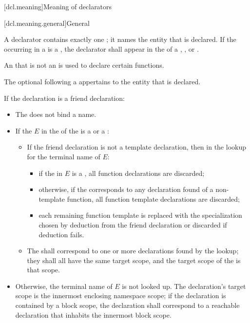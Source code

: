 [dcl.meaning]{Meaning of declarators}%

[dcl.meaning.general]{General}%

\pnum
{}%
A declarator contains exactly one ;
it names the entity that is declared.
If the  occurring in a 
is a ,
the declarator shall appear in the  of a
,
, or
.
\begin{note}
An  that is not an 
is used to declare
certain functions.
\end{note}
The optional  following a  appertains to the entity that is declared.

\pnum
If the declaration is a friend declaration:
\begin{itemize}
\item
The  does not bind a name.
\item
If the  $E$ in
the  of the  is
a  or a :
\begin{itemize}
  \item
If the friend declaration is not a template declaration,
then in the lookup for the terminal name of $E$:
\begin{itemize}
    \item
if the  in $E$ is a ,
all function declarations are discarded;
    \item
otherwise,
if the  corresponds to
any declaration found of a non-template function,
all function template declarations are discarded;
    \item
each remaining function template is replaced with the specialization chosen by
deduction from the friend declaration or
discarded if deduction fails.
\end{itemize}
  \item
The  shall correspond to
one or more declarations found by the lookup;
they shall all have the same target scope, and
the target scope of the  is that scope.
\end{itemize}
\item
Otherwise, the terminal name of $E$ is not looked up.
The declaration's target scope is the innermost enclosing namespace scope;
if the declaration is contained by a block scope,
the declaration shall correspond to a reachable declaration
that inhabits the innermost block scope.
\end{itemize}

